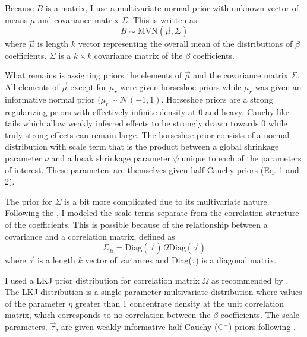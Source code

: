 \documentclass[12pt,letterpaper]{article}
\begin{document}
Because \(B\) is a matrix, I use a multivariate normal prior with unknown vector of means \(\mu\) and covariance matrix \(\Sigma\). This is written as 
\begin{equation}
  B \sim \mathrm{MVN}(\vec{\mu}, \Sigma)
  \label{eq:beta_prior}
\end{equation}
where \(\vec{\mu}\) is length \(k\) vector representing the overall mean of the distributions of \(\beta\) coefficients. \(\Sigma\) is a \(k \times k\) covariance matrix of the \(\beta\) coefficients.

What remains is assigning priors the elements of \(\vec{\mu}\) and the covariance matrix \(\Sigma\). All elements of \(\vec{\mu}\) except for \(\mu_{r}\) were given horseshoe priors \citep{Carvalho2010,Carvalho2009} while \(\mu_{r}\) was given an informative normal prior (\(\mu_{r} \sim \mathcal{N}(-1, 1)\). Horseshoe priors are a strong regularizing priors with effectively infinite density at 0 and heavy, Cauchy-like tails \citep{Carvalho2010,Carvalho2009} which allow weakly inferred effects to be strongly drawn towards 0 while truly strong effects can remain large. The horseshoe prior consists of a normal distribution with scale term that is the product between a global shrinkage parameter \(\nu\) and a locak shrinkage parameter \(\psi\) unique to each of the parameters of interest. These parameters are themselves given half-Cauchy priors (Eq. 1 and 2).

The prior for \(\Sigma\) is a bit more complicated due to its multivariate nature. Following the \citet{stan-manual:2014}, I modeled the scale terms separate from the correlation structure of the coefficients. This is possible because of the relationship between a covariance and a correlation matrix, defined as 
\begin{equation}
  \Sigma_{B} = \text{Diag}(\vec{\tau}) \Omega \text{Diag}(\vec{\tau})
  \label{eq:covcor}
\end{equation}
where \(\vec{\tau}\) is a length \(k\) vector of variances and Diag(\(\tau\)) is a diagonal matrix.

I used a LKJ prior distribution for correlation matrix \(\Omega\) as recommended by \citet{stan-manual:2014}. The LKJ distribution is a single parameter multivariate distribution where values of the parameter \(\eta\) greater than 1 concentrate density at the unit correlation matrix, which corresponds to no correlation between the \(\beta\) coefficients. The scale parameters, \(\vec{\tau}\), are given weakly informative half-Cauchy (C\(^{+}\)) priors following \citet{Gelman2006a}.
\end{document}
